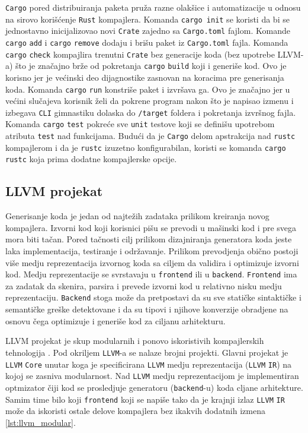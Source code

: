 \verb|Cargo| pored distribuiranja paketa pruža razne olakšice i automatizacije u odnosu na sirovo korišćenje \verb|Rust| kompajlera. 
Komanda \verb|cargo init| se koristi da bi se jednostavno inicijalizovao novi \verb|Crate| zajedno sa \verb|Cargo.toml| fajlom. 
Komande \verb|cargo| \verb|add| i \verb|cargo| \verb|remove| dodaju i brišu paket iz \verb|Cargo.toml| fajla.
Komanda \verb|cargo| \verb|check| kompajlira trenutni \verb|Crate| bez generacije koda (bez upotrebe LLVM-a) što je značajno brže 
od pokretanja \verb|cargo| \verb|build| koji i generiše kod. Ovo je korisno jer je većinski deo dijagnostike zasnovan 
na koracima pre generisanja koda. Komanda \verb|cargo| \verb|run| konstriše paket i izvršava ga. Ovo je značajno jer u većini slučajeva korisnik želi da pokrene program nakon što je 
napisao izmenu i izbegava \verb|CLI| gimnastiku dolaska do \verb|/target| foldera i pokretanja izvršnog fajla. 
Komanda \verb|cargo| \verb|test| pokreće sve \verb|unit| testove koji se definišu upotrebom atributa \verb|test| nad funkcijama.
Budući da je \verb|Cargo| delom apstrakcija nad \verb|rustc| kompajlerom i da je \verb|rustc| izuzetno konfigurabilan, koristi se komanda \verb|cargo| \verb|rustc|
koja prima dodatne kompajlerske opcije.

\newpage

\subsection{LLVM projekat}

Generisanje koda je jedan od najtežih zadataka prilikom kreiranja novog kompajlera. Izvorni kod koji 
korisnici pišu se prevodi u mašinski kod i pre svega mora biti tačan. Pored tačnosti cilj prilikom 
dizajniranja generatora koda jeste laka implementacija, testiranje i održavanje.
Prilikom prevodjenja obično postoji 
više medju reprezentacija izvornog koda sa ciljem da validira i optimizuje izvorni kod. Medju reprezentacije 
se svrstavaju u \verb|frontend| ili u \verb|backend|. \verb|Frontend| ima za zadatak da skenira, parsira 
i prevede izvorni kod u relativno nisku medju reprezentaciju. \verb|Backend| stoga može da pretpostavi 
da su sve statičke sintaktičke i semantičke greške detektovane i da su tipovi i njihove konverzije
obradjene na osnovu čega optimizuje i generiše kod za ciljanu arhitekturu.

LLVM projekat je skup modularnih i ponovo iskoristivih kompajlerskih tehnologija \cite{llvm}. Pod okriljem \verb|LLVM|-a
se nalaze brojni projekti. Glavni projekat je \verb|LLVM| \verb|Core| unutar koga je specificirana \verb|LLVM|
medju reprezentacija (\verb|LLVM| \verb|IR|) na kojoj se zasniva modularnost. Nad \verb|LLVM| medju reprezentacijom
je implementiran optmizator čiji kod se prosledjuje generatoru (\verb|backend|-u) koda cljane arhitekture. Samim time 
bilo koji \verb|frontend| koji se napiše tako da je krajnji izlaz \verb|LLVM| \verb|IR| može da iskoristi 
ostale delove kompajlera bez ikakvih dodatnih izmena \ref{lst:llvm_modular}.

